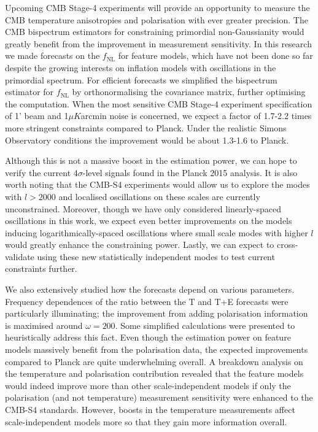 Upcoming CMB Stage-4 experiments will provide an opportunity to measure the CMB temperature anisotropies and polarisation with ever greater precision. The CMB bispectrum estimators for constraining primordial non-Gaussianity would greatly benefit from the improvement in measurement sensitivity. In this research we made forecasts on the $f_\text{NL}$ for feature models, which have not been done so far despite the growing interests on inflation models with oscillations in the primordial spectrum. For efficient forecasts we simplified the bispectrum estimator for $f_\text{NL}$ by orthonormalising the covariance matrix, further optimising the computation. When the most sensitive CMB Stage-4 experiment specification of 1' beam and 1$\mu K$arcmin noise is concerned, we expect a factor of 1.7-2.2 times more stringent constraints compared to Planck. Under the realistic Simons Observatory conditions the improvement would be about 1.3-1.6 to Planck.

Although this is not a massive boost in the estimation power, we can hope to verify the current 4$\sigma$-level signals found in the Planck 2015 analysis. It is also worth noting that the CMB-S4 experiments would allow us to explore the modes with $l>2000$ and localised oscillations on these scales are currently unconstrained. Moreover, though we have only considered linearly-spaced oscillations in this work, we expect even better improvements on the models inducing logarithmically-spaced oscillations where small scale modes with higher $l$ would greatly enhance the constraining power. Lastly, we can expect to cross-validate using these new statistically independent modes to test current constraints further.

We also extensively studied how the forecasts depend on various parameters. Frequency dependences of the ratio between the T and T+E forecasts were particularly illuminating; the improvement from adding polarisation information is maximised around $\omega = 200$. Some simplified calculations were presented to heuristically address this fact. Even though the estimation power on feature models massively benefit from the polarisation data, the expected improvements compared to Planck are quite underwhelming overall. A breakdown analysis on the temperature and polarisation contribution revealed that the feature models would indeed improve more than other scale-independent models if only the polarisation (and not temperature) measurement sensitivity were enhanced to the CMB-S4 standards. However, boosts in the temperature measurements affect scale-independent models more so that they gain more information overall.

